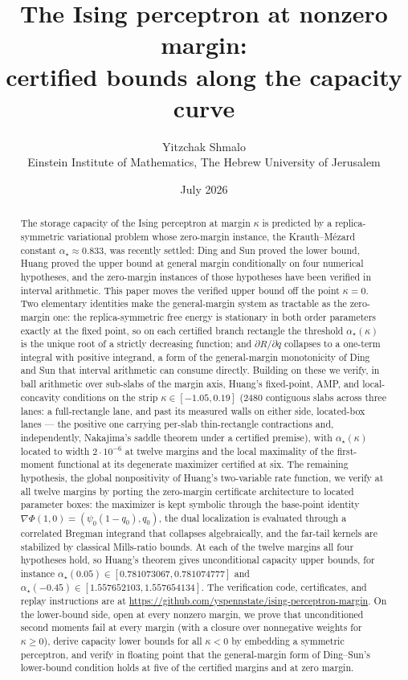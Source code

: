 \documentclass[11pt]{article}
\title{The Ising perceptron at nonzero margin:\\
certified bounds along the capacity curve}
\author{Yitzchak Shmalo\\
\small Einstein Institute of Mathematics, The Hebrew University of Jerusalem\\
\small }
\date{July 2026}
\theoremstyle{remark}
\begin{document}
\maketitle

\begin{abstract}
The storage capacity of the Ising perceptron at margin $\kappa$ is
predicted by a replica-symmetric variational problem whose zero-margin
instance, the Krauth--M\'ezard constant $\alpha_\star\approx 0.833$, was
recently settled: Ding and Sun proved the lower bound, Huang proved the
upper bound at general margin conditionally on four numerical
hypotheses, and the zero-margin instances of those hypotheses have been
verified in interval arithmetic.  This paper moves the verified upper
bound off the point $\kappa=0$.  Two elementary identities make the
general-margin system as tractable as the zero-margin one: the
replica-symmetric free energy is stationary in both order parameters
exactly at the fixed point, so on each certified branch rectangle
the threshold $\alpha_\star(\kappa)$ is the unique root of a strictly
decreasing function; and $\partial R/\partial q$ collapses to a
one-term integral with positive integrand, a form of the
general-margin monotonicity of Ding and Sun that interval arithmetic
can consume directly.  Building on these we verify, in ball arithmetic over
sub-slabs of the margin axis, Huang's fixed-point, AMP, and
local-concavity conditions on the strip $\kappa\in[-1.05,0.19]$
($2480$ contiguous slabs across three lanes: a full-rectangle lane,
and past its measured walls on either side, located-box lanes ---
the positive one carrying per-slab thin-rectangle contractions and,
independently, Nakajima's saddle theorem under a certified premise),
with
$\alpha_\star(\kappa)$ located to width $2\cdot10^{-6}$ at twelve
margins and the local maximality of the first-moment functional at its
degenerate maximizer certified at six.  The remaining hypothesis, the
global nonpositivity of Huang's two-variable rate function, we verify
at all twelve margins by porting the zero-margin certificate
architecture to located parameter boxes: the maximizer is kept
symbolic through the base-point identity
$\nabla\Phi(1,0)=(\psi_0(1-q_0),q_0)$, the dual localization is
evaluated through a correlated Bregman integrand that collapses
algebraically, and the far-tail kernels are stabilized by classical
Mills-ratio bounds.  At each of the twelve margins all four hypotheses hold,
so Huang's theorem gives unconditional capacity upper bounds, for
instance $\alpha_\star(0.05)\in[0.781073067,0.781074777]$ and
$\alpha_\star(-0.45)\in[1.557652103,1.557654134]$.  The verification
code, certificates, and replay instructions are at
\url{https://github.com/yspennstate/ising-perceptron-margin}.
  On the lower-bound side, open at every nonzero
margin, we prove that unconditioned second moments fail at every
margin (with a closure over nonnegative weights for
$\kappa\ge0$), derive capacity lower bounds for all $\kappa<0$ by
embedding a symmetric perceptron, and verify in floating point that
the general-margin form of Ding--Sun's lower-bound condition holds
at five of the certified margins and at zero margin.
\end{abstract}
\end{document}
